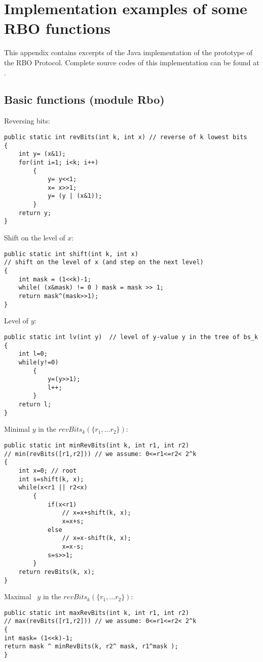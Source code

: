 \appendix

\section{Implementation examples of some RBO functions}
\label{}
This appendix contains excerpts of the Java implementation of the
prototype of the RBO Protocol.
Complete source codes of this implementation can
be found at \cite{RBO-WWW}.
\subsection{Basic functions (module Rbo)}
\label{Rbo-Java}
Reversing bits:
\begin{verbatim}
public static int revBits(int k, int x) // reverse of k lowest bits
{
    int y= (x&1);
    for(int i=1; i<k; i++)
        {
            y= y<<1;
            x= x>>1;
            y= (y | (x&1));
        }
    return y;
}
\end{verbatim}
Shift on the level of $x$:
\begin{verbatim}
public static int shift(int k, int x) 
// shift on the level of x (and step on the next level)
{
    int mask = (1<<k)-1;
    while( (x&mask) != 0 ) mask = mask >> 1;
    return mask^(mask>>1);
}

\end{verbatim}
Level of $y$:
\begin{verbatim}
public static int lv(int y)  // level of y-value y in the tree of bs_k
{
    int l=0;
    while(y!=0) 
        {
            y=(y>>1);
            l++;
        }
    return l;
}
\end{verbatim}
Minimal $y$ in the $revBits_k(\{r_1,\ldots r_2\})$:
\begin{verbatim}
public static int minRevBits(int k, int r1, int r2)
// min(revBits([r1,r2])) // we assume: 0<=r1<=r2< 2^k
{
    int x=0; // root
    int s=shift(k, x);
    while(x<r1 || r2<x)
        {
            if(x<r1)
                // x=x+shift(k, x);
                x=x+s;
            else
                // x=x-shift(k, x);
                x=x-s;
            s=s>>1;
        }
    return revBits(k, x);
}
\end{verbatim}
Maximal \ $y$ in the $revBits_k(\{r_1,\ldots r_2\})$:
\begin{verbatim}
public static int maxRevBits(int k, int r1, int r2)
// max(revBits([r1,r2])) // we assume: 0<=r1<=r2< 2^k
{
int mask= (1<<k)-1;
return mask ^ minRevBits(k, r2^ mask, r1^mask );
}
\end{verbatim}


